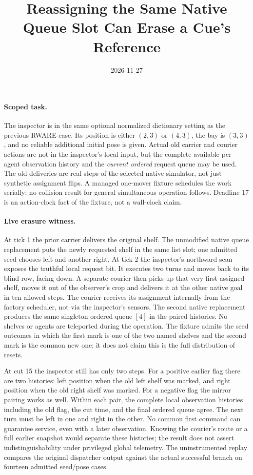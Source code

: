 \documentclass{article}
\title{Reassigning the Same Native Queue Slot Can Erase a Cue's Reference}
\date{2026-11-27}
\begin{document}
\maketitle

\paragraph{Scoped task.}
The inspector is in the same optional normalized dictionary
setting as the previous RWARE case. Its position is either
\((2,3)\) or \((4,3)\), the bay is \((3,3)\), and no reliable
additional initial pose is given. Actual old carrier and courier
actions are not in the inspector's local input, but the
complete available per-agent observation history and the
\emph{current ordered} request queue may be used. The old
deliveries are real steps of the selected native simulator,
not just synthetic assignment flips. A managed one-mover
fixture schedules the work serially; no collision result
for general simultaneous operation follows. Deadline 17 is
an action-clock fact of the fixture, not a wall-clock claim.

\paragraph{Live erasure witness.}
At tick 1 the prior carrier delivers the original shelf.
The unmodified native queue replacement puts the newly
requested shelf in the same list slot; one admitted seed
chooses left and another right. At tick 2 the inspector's
northward scan exposes the truthful local request bit.
It executes two turns and moves back to its blind row,
facing down. A separate courier then picks up that very
first assigned shelf, moves it out of the observer's crop and
delivers it at the other native goal in ten allowed steps.
The courier receives its assignment internally from the
factory scheduler, not via the inspector's sensors. The
second native replacement produces the same singleton ordered
queue \([4]\) in the paired histories. No shelves or agents
are teleported during the operation. The fixture admits
the seed outcomes in which the first mark is one of the
two named shelves and the second mark is the common new one;
it does not claim this is the full distribution of resets.

At cut 15 the inspector still has only two steps.
For a positive earlier flag there are two histories:
left position when the old left shelf was marked, and
right position when the old right shelf was marked.
For a negative flag the mirror pairing works as well.
Within each pair, the complete local observation histories
including the old flag, the cut time, and the final
ordered queue agree. The next turn must be left in one
and right in the other. No common first command can
guarantee service, even with a later observation. Knowing
the courier's route or a full earlier snapshot would
separate these histories; the result does not assert
indistinguishability under privileged global telemetry.
The uninstrumented replay compares the original dispatcher
output against the actual successful branch on fourteen
admitted seed/pose cases.
\end{document}
